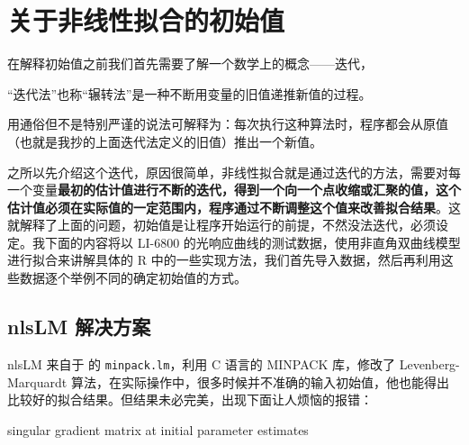 \documentclass[
]{krantz}
\makeatletter
\newenvironment{Shaded}{\begin{snugshade}}{\end{snugshade}}
\newcommand{\CommentTok}[1]{\textcolor[rgb]{0.56,0.35,0.01}{\textit{#1}}}
\newcommand{\KeywordTok}[1]{\textcolor[rgb]{0.13,0.29,0.53}{\textbf{#1}}}
\newcommand{\NormalTok}[1]{#1}
\newcommand{\OperatorTok}[1]{\textcolor[rgb]{0.81,0.36,0.00}{\textbf{#1}}}
\newcommand{\StringTok}[1]{\textcolor[rgb]{0.31,0.60,0.02}{#1}}
\renewenvironment{quote}{\begin{VF}}{\end{VF}}
\newenvironment{kframe}{%
\medskip{}
\setlength{\fboxsep}{.8em}
 \def\at@end@of@kframe{}%
 \ifinner\ifhmode%
  \def\at@end@of@kframe{\end{minipage}}%
  \begin{minipage}{\columnwidth}%
 \fi\fi%
 \def\FrameCommand##1{\hskip\@totalleftmargin \hskip-\fboxsep
 \colorbox{shadecolor}{##1}\hskip-\fboxsep
     \hskip-\linewidth \hskip-\@totalleftmargin \hskip\columnwidth}%
 \MakeFramed {\advance\hsize-\width
   \@totalleftmargin\z@ \linewidth\hsize
   \@setminipage}}%
 {\par\unskip\endMakeFramed%
 \at@end@of@kframe}
\renewenvironment{Shaded}{\begin{kframe}}{\end{kframe}}
\makeatother
\begin{document}
\cleardoublepage

\hypertarget{start_con}{%
\chapter{关于非线性拟合的初始值}\label{start_con}}

在解释初始值之前我们首先需要了解一个数学上的概念------迭代，

\begin{quote}
``迭代法''也称``辗转法''是一种不断用变量的旧值递推新值的过程。
\end{quote}

用通俗但不是特别严谨的说法可解释为：每次执行这种算法时，程序都会从原值（也就是我抄的上面迭代法定义的旧值）推出一个新值。

之所以先介绍这个迭代，原因很简单，非线性拟合就是通过迭代的方法，需要对每一个变量\textbf{最初的估计值进行不断的迭代，得到一个向一个点收缩或汇聚的值，这个估计值必须在实际值的一定范围内，程序通过不断调整这个值来改善拟合结果}。这就解释了上面的问题，初始值是让程序开始运行的前提，不然没法迭代，必须设定。我下面的内容将以 LI-6800 的光响应曲线的测试数据，使用非直角双曲线模型进行拟合来讲解具体的 R 中的一些实现方法，我们首先导入数据，然后再利用这些数据逐个举例不同的确定初始值的方式。

\begin{Shaded}
\end{Shaded}

\hypertarget{nlslm}{%
\section{nlsLM 解决方案}\label{nlslm}}

nlsLM 来自于 \citet{Elzhov2016minpack} 的 \texttt{minpack.lm}，利用 C 语言的 MINPACK 库，修改了 Levenberg-Marquardt 算法，在实际操作中，很多时候并不准确的输入初始值，他也能得出比较好的拟合结果。但结果未必完美，出现下面让人烦恼的报错：

\begin{quote}
singular gradient matrix at initial parameter estimates
\end{quote}
\end{document}
